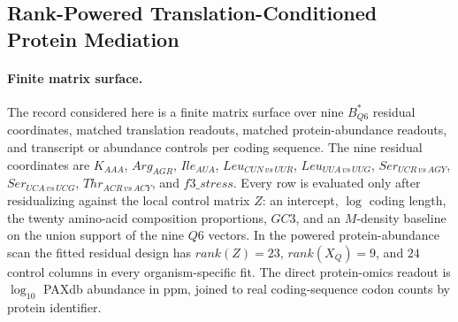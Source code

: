 \subsection{Rank-Powered Translation-Conditioned Protein Mediation}
\label{sec:q6-rank-powered-translation-conditioned-protein-mediation-cross-layer}

\paragraph{Finite matrix surface.}
The record considered here is a finite matrix surface over nine $B^{*}_{Q6}$ residual coordinates, matched translation readouts, matched protein-abundance readouts, and transcript or abundance controls per coding sequence.  The nine residual coordinates are $K_{AAA}$, $Arg_{AGR}$, $Ile_{AUA}$, $Leu_{CUN\,vs\,UUR}$, $Leu_{UUA\,vs\,UUG}$, $Ser_{UCR\,vs\,AGY}$, $Ser_{UCA\,vs\,UCG}$, $Thr_{ACR\,vs\,ACY}$, and $f3\_stress$.  Every row is evaluated only after residualizing against the local control matrix $Z$: an intercept, $\log$ coding length, the twenty amino-acid composition proportions, $GC3$, and an $M$-density baseline on the union support of the nine $Q6$ vectors.  In the powered protein-abundance scan the fitted residual design has $rank(Z)=23$, $rank(X_{Q})=9$, and $24$ control columns in every organism-specific fit.  The direct protein-omics readout is $\log_{10}$ PAXdb abundance in ppm, joined to real coding-sequence codon counts by protein identifier.

